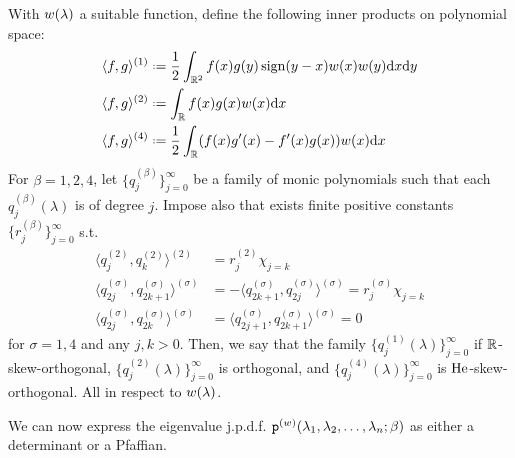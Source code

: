 \begin{definition}
	With $w(\lambda)$ a suitable function, define the following inner products on polynomial space:
	\begin{align}
		\langle f,g \rangle^{(1)} & \deff \frac{1}{2} \int_{\R^2} f(x) g(y) \sign(y-x) \wf(x) \wf(y) \dd x \dd y \\
		\langle f,g \rangle^{(2)} & \deff \int_{\R} f(x) g(x) \wf(x) \dd x \\
		\langle f,g \rangle^{(4)} & \deff \frac{1}{2} \int_{\R} (f(x)g'(x) - f'(x)g(x)) \wf(x) \dd x
	\end{align}
	For $\beta = 1,2,4$, let $\{q_j^{(\beta)}\}_{j=0}^\infty$ be a family of monic polynomials such that each $q_j^{(\beta)}(\lambda)$ is of degree $j$. Impose also that exists finite positive constants $\{r_j^{(\beta)}\}_{j=0}^\infty$ s.t.
	\begin{align}
	\langle q_j^{(2)}, q_k^{(2)} \rangle^{(2)} & = r_j^{(2)} \chi_{j=k} \\
	\langle q^{(\sigma)}_{2j}, q^{(\sigma)}_{2k+1} \rangle^{(\sigma)} & = - \langle q^{(\sigma)}_{2k+1}, q^{(\sigma)}_{2j} \rangle^{(\sigma)} = r_j^{(\sigma)} \chi_{j=k} \\
	\langle q^{(\sigma)}_{2j}, q^{(\sigma)}_{2k} \rangle^{(\sigma)} & = \langle q^{(\sigma)}_{2j+1}, q^{(\sigma)}_{2k+1} \rangle^{(\sigma)} = 0
	\end{align}	
	for $\sigma = 1, 4$ and any $j,k>0$. Then, we say that the family $\{q_j^{(1)}(\lambda)\}_{j=0}^\infty$ if $\mathbb{R}$-skew-orthogonal, $\{q_j^{(2)}(\lambda)\}_{j=0}^\infty$ is orthogonal, and $\{q_j^{(4)}(\lambda)\}_{j=0}^\infty$ is $\mathrm{He}$-skew-orthogonal. All in respect to $w(\lambda)$.
\end{definition}

We can now express the eigenvalue j.p.d.f. $\mathtt{p}^{(w)}(\lambda_1, \lambda_2, \dots, \lambda_n;\beta)$ as either a determinant or a Pfaffian. 

